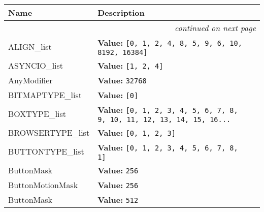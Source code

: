     \vspace{-1cm}
\hspace{\varindent}\begin{longtable}{|p{\varnamewidth}|p{\vardescrwidth}|l}
\cline{1-2}
\cline{1-2} \centering \textbf{Name} & \centering \textbf{Description}& \\
\cline{1-2}
\endhead\cline{1-2}\multicolumn{3}{r}{\small\textit{continued on next page}}\\\endfoot\cline{1-2}
\endlastfoot\raggedright A\-L\-I\-G\-N\-\_\-l\-i\-s\-t\- & \raggedright \textbf{Value:} 
{\tt \texttt{[}0\texttt{, }1\texttt{, }2\texttt{, }4\texttt{, }8\texttt{, }5\texttt{, }9\texttt{, }6\texttt{, }10\texttt{, }8192\texttt{, }16384\texttt{]}}&\\
\cline{1-2}
\raggedright A\-S\-Y\-N\-C\-I\-O\-\_\-l\-i\-s\-t\- & \raggedright \textbf{Value:} 
{\tt \texttt{[}1\texttt{, }2\texttt{, }4\texttt{]}}&\\
\cline{1-2}
\raggedright A\-n\-y\-M\-o\-d\-i\-f\-i\-e\-r\- & \raggedright \textbf{Value:} 
{\tt 32768}&\\
\cline{1-2}
\raggedright B\-I\-T\-M\-A\-P\-T\-Y\-P\-E\-\_\-l\-i\-s\-t\- & \raggedright \textbf{Value:} 
{\tt \texttt{[}0\texttt{]}}&\\
\cline{1-2}
\raggedright B\-O\-X\-T\-Y\-P\-E\-\_\-l\-i\-s\-t\- & \raggedright \textbf{Value:} 
{\tt \texttt{[}0\texttt{, }1\texttt{, }2\texttt{, }3\texttt{, }4\texttt{, }5\texttt{, }6\texttt{, }7\texttt{, }8\texttt{, }9\texttt{, }10\texttt{, }11\texttt{, }12\texttt{, }13\texttt{, }14\texttt{, }15\texttt{, }16\texttt{...}}&\\
\cline{1-2}
\raggedright B\-R\-O\-W\-S\-E\-R\-T\-Y\-P\-E\-\_\-l\-i\-s\-t\- & \raggedright \textbf{Value:} 
{\tt \texttt{[}0\texttt{, }1\texttt{, }2\texttt{, }3\texttt{]}}&\\
\cline{1-2}
\raggedright B\-U\-T\-T\-O\-N\-T\-Y\-P\-E\-\_\-l\-i\-s\-t\- & \raggedright \textbf{Value:} 
{\tt \texttt{[}0\texttt{, }1\texttt{, }2\texttt{, }3\texttt{, }4\texttt{, }5\texttt{, }6\texttt{, }7\texttt{, }8\texttt{, }1\texttt{]}}&\\
\cline{1-2}
\raggedright B\-u\-t\-t\-o\-n\-1\-M\-a\-s\-k\- & \raggedright \textbf{Value:} 
{\tt 256}&\\
\cline{1-2}
\raggedright B\-u\-t\-t\-o\-n\-1\-M\-o\-t\-i\-o\-n\-M\-a\-s\-k\- & \raggedright \textbf{Value:} 
{\tt 256}&\\
\cline{1-2}
\raggedright B\-u\-t\-t\-o\-n\-2\-M\-a\-s\-k\- & \raggedright \textbf{Value:} 
{\tt 512}&\\

\end{longtable}
